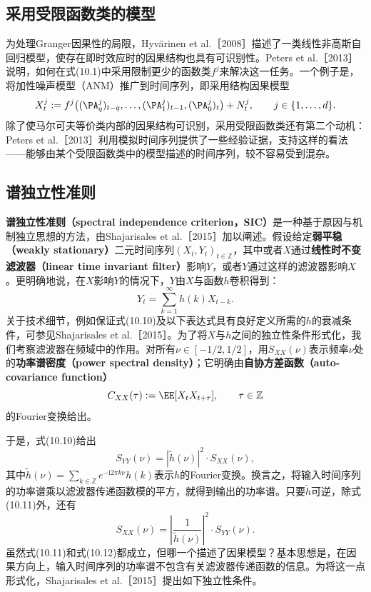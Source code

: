 \subsection{采用受限函数类的模型}
为处理Granger因果性的局限，Hyvärinen et al.［2008］描述了一类线性非高斯自回归模型，使存在即时效应时的因果结构也具有可识别性。Peters et al.［2013］说明，如何在式(10.1)中采用限制更少的函数类$f^j$来解决这一任务。一个例子是，将加性噪声模型（ANM）推广到时间序列，即采用结构因果模型
\[
 X_t^j:=f^j\bigl((\PA_q^j)_{t-q},\ldots,(\PA_1^j)_{t-1},(\PA_0^j)_t\bigr)+N_t^j,
 \qquad j\in\{1,\ldots,d\}.
\]
除了使马尔可夫等价类内部的因果结构可识别，采用受限函数类还有第二个动机：Peters et al.［2013］利用模拟时间序列提供了一些经验证据，支持这样的看法——能够由某个受限函数类中的模型描述的时间序列，较不容易受到混杂。

\subsection{谱独立性准则}
\textbf{谱独立性准则（spectral independence criterion，SIC）}是一种基于原因与机制独立思想的方法，由Shajarisales et al.［2015］加以阐述。假设给定\textbf{弱平稳（weakly stationary）}二元时间序列$(X_t,Y_t)_{t\in\mathbb Z}$，其中或者$X$通过\textbf{线性时不变滤波器（linear time invariant filter）}影响$Y$，或者$Y$通过这样的滤波器影响$X$。更明确地说，在$X$影响$Y$的情况下，$Y$由$X$与函数$h$卷积得到：
\begin{equation}
 Y_t=\sum_{k=1}^{\infty}h(k)X_{t-k}.
 \tag{10.10}
\end{equation}
关于技术细节，例如保证式(10.10)及以下表达式具有良好定义所需的$h$的衰减条件，可参见Shajarisales et al.［2015］。为了将$X$与$h$之间的独立性条件形式化，我们考察滤波器在频域中的作用。对所有$\nu\in[-1/2,1/2]$，用$S_{XX}(\nu)$表示频率$\nu$处的\textbf{功率谱密度（power spectral density）}；它明确由\textbf{自协方差函数（auto-covariance function）}
\[
 C_{XX}(\tau):=\EE[X_tX_{t+\tau}],\qquad\tau\in\mathbb Z
\]
的Fourier变换给出。

于是，式(10.10)给出
\begin{equation}
 S_{YY}(\nu)=|\widetilde h(\nu)|^2\cdot S_{XX}(\nu),
 \tag{10.11}
\end{equation}
其中$\widetilde h(\nu)=\sum_{k\in\mathbb Z}e^{-\mathrm i2\pi k\nu}h(k)$表示$h$的Fourier变换。换言之，将输入时间序列的功率谱乘以滤波器传递函数模的平方，就得到输出的功率谱。只要$\widetilde h$可逆，除式(10.11)外，还有
\begin{equation}
 S_{XX}(\nu)=\left|\frac{1}{\widetilde h(\nu)}\right|^2\cdot S_{YY}(\nu).
 \tag{10.12}
\end{equation}
虽然式(10.11)和式(10.12)都成立，但哪一个描述了因果模型？基本思想是，在因果方向上，输入时间序列的功率谱不包含有关滤波器传递函数的信息。为将这一点形式化，Shajarisales et al.［2015］提出如下独立性条件。

